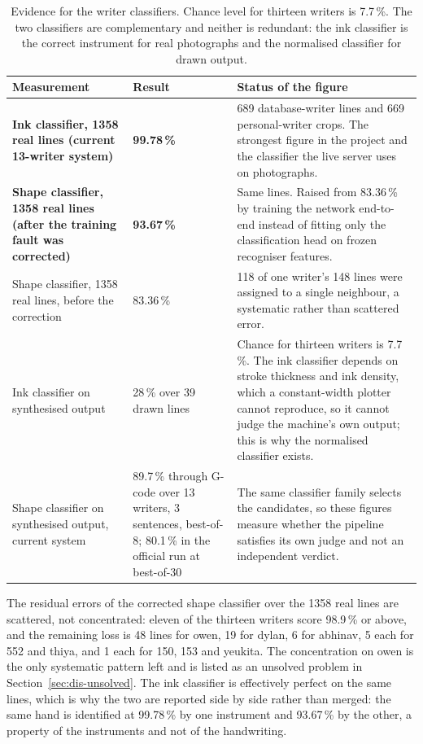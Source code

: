 \begin{table}[!htbp]
\centering
\fontsize{9.5}{11.5}\selectfont
\begin{tabularx}{\linewidth}{|p{4.2cm}|p{2.5cm}|X|}
\hline
\textbf{Measurement} & \textbf{Result} & \textbf{Status of the figure} \\
\hline
\textbf{Ink classifier, 1358 real lines (current 13-writer system)} & \textbf{99.78\,\%} & 689 database-writer lines and 669 personal-writer crops. The strongest figure in the project and the classifier the live server uses on photographs. \\
\hline
\textbf{Shape classifier, 1358 real lines (after the training fault was corrected)} & \textbf{93.67\,\%} & Same lines. Raised from 83.36\,\% by training the network end-to-end instead of fitting only the classification head on frozen recogniser features. \\
\hline
Shape classifier, 1358 real lines, before the correction & 83.36\,\% & 118 of one writer's 148 lines were assigned to a single neighbour, a systematic rather than scattered error. \\
\hline
Ink classifier on synthesised output & 28\,\% over 39 drawn lines & Chance for thirteen writers is 7.7\,\%. The ink classifier depends on stroke thickness and ink density, which a constant-width plotter cannot reproduce, so it cannot judge the machine's own output; this is why the normalised classifier exists. \\
\hline
Shape classifier on synthesised output, current system & 89.7\,\% through G-code over 13 writers, 3 sentences, best-of-8; 80.1\,\% in the official run at best-of-30 & The same classifier family selects the candidates, so these figures measure whether the pipeline satisfies its own judge and not an independent verdict. \\
\hline
\end{tabularx}
\caption{Evidence for the writer classifiers. Chance level for thirteen writers is 7.7\,\%. The two classifiers are complementary and neither is redundant: the ink classifier is the correct instrument for real photographs and the normalised classifier for drawn output.}
\label{tab:wid-results}
\end{table}

The residual errors of the corrected shape classifier over the 1358 real lines are scattered, not concentrated: eleven of the thirteen writers score 98.9\,\% or above, and the remaining loss is 48 lines for owen, 19 for dylan, 6 for abhinav, 5 each for 552 and thiya, and 1 each for 150, 153 and yeukita. The concentration on owen is the only systematic pattern left and is listed as an unsolved problem in Section~\ref{sec:dis-unsolved}.
The ink classifier is effectively perfect on the same lines, which is why the two are reported side by side rather than merged: the same hand is identified at 99.78\,\% by one instrument and 93.67\,\% by the other, a property of the instruments and not of the handwriting.

